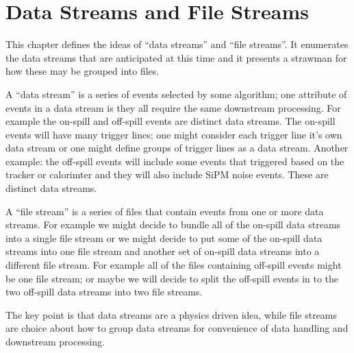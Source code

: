 \chapter{Data Streams and File Streams}
\label{ch:DataStreamsAndFileStreams}

This chapter defines the ideas of ``data streams'' and ``file streams''.
It enumerates the data streams that are anticipated at this time
and it presents a strawman for how these may be grouped into files.


A ``data stream'' is a series of events selected by some algorithm;
one attribute of events in a data stream is they all require the same downstream processing.
For example the on-spill and off-spill events are distinct data streams.
The on-spill events will have many trigger lines; one might consider each trigger
line it's own data stream or one might define groups of trigger lines as a data stream.
Another example: the off-spill events will include some events that triggered based on
the tracker or calorimter and they will also include SiPM noise events.
These are distinct data streams.

A ``file stream'' is a series of files that contain events from one or more data streams.
For example we might decide to bundle all of the on-spill data streams into a single
file stream or we might decide to put some of the on-spill data streams into one file
stream and another set of on-spill data streams into a different file stream.
For example all of the files containing off-spill events might be one file stream;
or maybe we will decide to split the off-spill events in to
the two off-spill data streams into two file streams.

The key point is that data streams are a physics driven idea,
while file streams are choice about how to group data streams for convenience of data handling and downstream processing.



